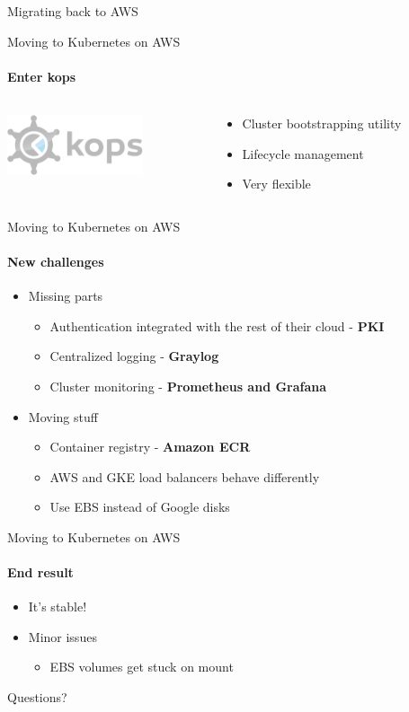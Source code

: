 \documentclass[14pt]{beamer}
\newcommand{\imageframe}[2]{{
  \usebackgroundtemplate{\texttt{[image: \#1]}}
  \begin{frame}{\vspace{-6pt}\usebeamercolor[fg]{item}\huge{#2}}
  \end{frame}
}}
\begin{document}
  \imageframe{images/returning_cranes.jpg}{Migrating back to AWS}

  \begin{frame}{Moving to Kubernetes on AWS}
  \framesubtitle{Enter kops}
  \begin{columns}[c]
    \begin{column}{.3\textwidth}
      \includegraphics[width=4cm]{images/kops_logo.png}
    \end{column}
    \begin{column}{.7\textwidth}
      \begin{itemize}
        \item Cluster bootstrapping utility
        \item Lifecycle management
        \item Very flexible
      \end{itemize}
    \end{column}
  \end{columns}
  \end{frame}

  \begin{frame}{Moving to Kubernetes on AWS}
  \framesubtitle{New challenges}
  \begin{itemize}
    \item Missing parts
    \begin{itemize}
      \item Authentication integrated with the rest of their cloud - \textbf{PKI}
      \item Centralized logging - \textbf{Graylog}
      \item Cluster monitoring - \textbf{Prometheus and Grafana}
    \end{itemize}
    \item Moving stuff
    \begin{itemize}
      \item Container registry - \textbf{Amazon ECR}
      \item AWS and GKE load balancers behave differently
      \item Use EBS instead of Google disks
    \end{itemize}
  \end{itemize}
  \end{frame}

  \begin{frame}{Moving to Kubernetes on AWS}
  \framesubtitle{End result}
  \begin{itemize}
    \item It's stable!
    \bigskip
    \item Minor issues
    \begin{itemize}
      \item EBS volumes get stuck on mount
    \end{itemize}
  \end{itemize}
  \end{frame}

  \imageframe{images/questions.jpg}{Questions?}
\end{document}
